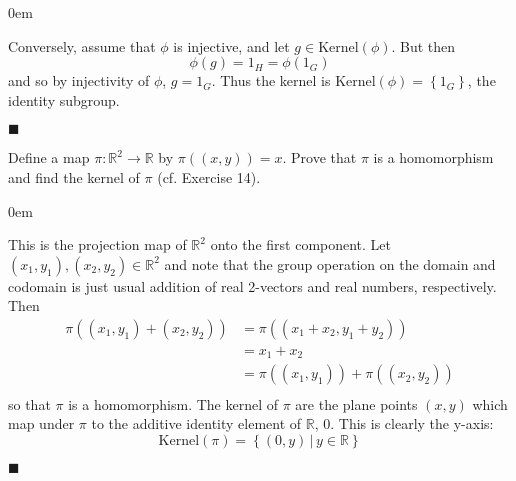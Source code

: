 \documentclass[12pt]{article}
\renewcommand{\qed}{\hfill$\blacksquare$}
\renewenvironment{proof}{\begin{addmargin}[1em]{0em}\begin{newproof}}{\end{newproof}\end{addmargin}\qed}
\newenvironment{problem}[2][Exercise]{\begin{trivlist}
\item[\hskip \labelsep {\bfseries #1}\hskip \labelsep {\bfseries #2.}]}{\end{trivlist}}
\begin{document}
\begin{proof}
Conversely, assume that $\phi$ is injective, and let $g\in\text{Kernel}\left(\phi\right)$. But then
$$ \phi\left(g\right) = 1_H = \phi\left(1_G\right) $$ and so by injectivity of $\phi$, $g=1_G$. Thus the kernel is $\text{Kernel}\left(\phi\right)=\left\{1_G\right\}$, the identity subgroup.
\end{proof}




\begin{problem}{1.6.15}
Define a map $\pi:\mathbb{R}^2\rightarrow \mathbb{R}$ by $\pi \left(\left(x,y\right)\right)=x$. Prove that $\pi$ is a homomorphism and find the kernel of $\pi$ (cf. Exercise 14).
\end{problem}
\begin{proof}
This is the projection map of $\mathbb{R}^2$ onto the first component. Let $\left(x_1,y_1\right),\left(x_2,y_2\right)\in \mathbb{R}^2$ and note that the group operation on the domain and codomain is just usual addition of real 2-vectors and real numbers, respectively. Then
\begin{equation*}
    \begin{split}
        \pi \left(\left(x_1,y_1\right)+\left(x_2,y_2\right)\right) & = \pi \left(\left(x_1+x_2, y_1+y_2\right)\right) \\
        & = x_1 + x_2 \\
        & = \pi\left( \left(x_1,y_1\right)\right) + \pi\left(\left(x_2,y_2\right) \right) \\
    \end{split}
\end{equation*}
so that $\pi$ is a homomorphism. The kernel of $\pi$ are the plane points $\left(x,y\right)$ which map under $\pi$ to the additive identity element of $\mathbb{R}$, 0. This is clearly the y-axis:
$$ \text{Kernel}\left(\pi\right) = \left\{ \left(0,y\right) \, | \, y\in \mathbb{R}\right\} $$
\end{proof}
\end{document}
